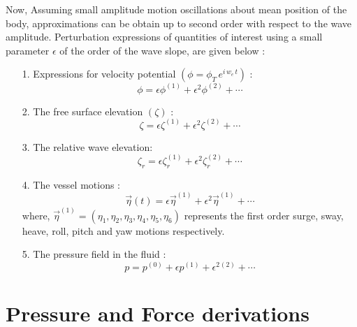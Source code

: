 Now, Assuming small amplitude motion oscillations about mean position of the body, approximations can be obtain 
up to second order with respect to the wave amplitude. Perturbation expressions of quantities 
of interest using a small parameter $\epsilon$ of the order of the wave slope, are given below :

\begin{itemize}
    \item [1.] Expressions for velocity potential $\left(\phi = \phi_T\,e^{i\,w_e\,t}\right)$ :
    \begin{equation}
        \phi = \epsilon \phi^{(1)} + \epsilon^2 \phi^{(2)} + \cdots
    \end{equation}

    \item [2.] The free surface elevation $(\zeta)$ :
    \begin{equation}
        \zeta = \epsilon \zeta^{(1)} + \epsilon^2 \zeta^{(2)} + \cdots
    \end{equation}

    \item [3.] The relative wave elevation:
    \begin{equation}
        \zeta_r = \epsilon \zeta_r^{(1)} + \epsilon^2 \zeta_r^{(2)} + \cdots
    \end{equation}

    \item [4.] The vessel motions :
    \begin{equation}
        \vec{\eta}(t) = \epsilon \vec{\eta}^{(1)} + \epsilon^2 \vec{\eta}^{(1)} + \cdots
    \end{equation}
    where, $\vec{\eta}^{(1)} = (\eta_1, \eta_2, \eta_3, \eta_4, \eta_5, \eta_6)$ represents the first order surge, 
    sway, heave, roll, pitch and yaw motions respectively.

    \item [5.] The pressure field in the fluid :
    \begin{equation}
        \label{eq:per_perssure}
        p = p^{(0)} + \epsilon p^{(1)} + \epsilon^{2} {^{(2)}} + \cdots
    \end{equation}
\end{itemize}



\section{Pressure and Force derivations}


